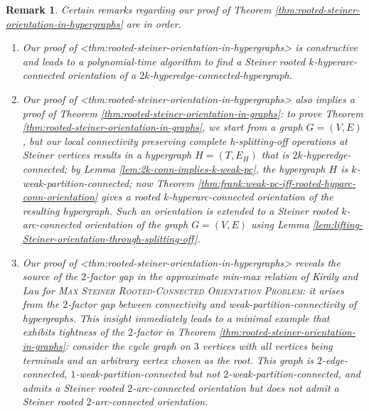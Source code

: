\documentclass{article}
\def\Cref#1{<#1>}%
\newtheorem{remark}{Remark}[section]
\begin{document}
\begin{remark}
Certain remarks regarding our proof of Theorem \ref{thm:rooted-steiner-orientation-in-hypergraphs} are in order.
\begin{enumerate}
\item Our proof of \Cref{thm:rooted-steiner-orientation-in-hypergraphs} is constructive and leads to a polynomial-time algorithm to find a Steiner rooted $k$-hyperarc-connected orientation of a $2k$-hyperedge-connected-hypergraph. 
\item Our proof of \Cref{thm:rooted-steiner-orientation-in-hypergraphs} also implies a proof of Theorem \ref{thm:rooted-steiner-orientation-in-graphs}: to prove Theorem \ref{thm:rooted-steiner-orientation-in-graphs}, we start from a graph $G=(V, E)$, but our local connectivity preserving complete h-splitting-off operations at Steiner vertices results in a hypergraph $H=(T, E_H)$ that is $2k$-hyperedge-connected; by Lemma \ref{lem:2k-conn-implies-k-weak-pc}, the hypergraph $H$ is $k$-weak-partition-connected;   
now Theorem \ref{thm:frank:weak-pc-iff-rooted-hyparc-conn-orientation} gives a rooted $k$-hyperarc-connected orientation of the resulting hypergraph. Such an orientation is extended to a Steiner rooted $k$-arc-connected orientation of the graph $G=(V, E)$ using Lemma \ref{lem:lifting-Steiner-orientation-through-splitting-off}. 
\item Our proof of \Cref{thm:rooted-steiner-orientation-in-hypergraphs} reveals the source of the $2$-factor gap in the approximate min-max relation of Kir\'{a}ly and Lau for \textsc{Max Steiner Rooted-Connected Orientation Problem}: it arises from the $2$-factor gap between connectivity and weak-partition-connectivity of hypergraphs. This insight immediately leads to a minimal example that exhibits tightness of the $2$-factor in Theorem %
\ref{thm:rooted-steiner-orientation-in-graphs}: consider the cycle graph on $3$ vertices with all vertices being terminals and an arbitrary vertex chosen as the root. This graph is $2$-edge-connected, $1$-weak-partition-connected but not $2$-weak-partition-connected, and admits a Steiner rooted $2$-arc-connected orientation but does not admit a Steiner rooted $2$-arc-connected orientation. 
\end{enumerate}
\end{remark}
\end{document}

